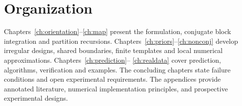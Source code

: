 \section*{Organization}
Chapters~\ref{ch:orientation}--\ref{ch:map} present the formulation, conjugate block integration
and partition recursions. Chapters~\ref{ch:priors}--\ref{ch:nonconj} develop irregular designs,
shared boundaries, finite templates and local numerical approximations. Chapters~\ref{ch:prediction}--
\ref{ch:realdata} cover prediction, algorithms, verification and examples. The concluding chapters
state failure conditions and open experimental requirements. The appendices provide annotated
literature, numerical implementation principles, and prospective experimental designs.
